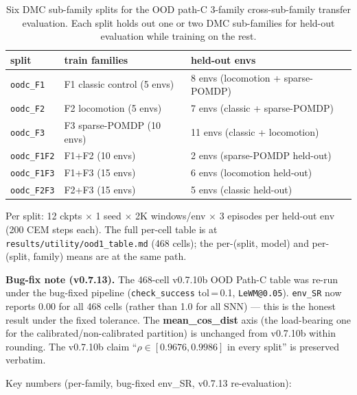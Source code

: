 \documentclass{article}
\begin{document}
\begin{table}[ht]
\centering
\small
\begin{tabular}{lll}
\toprule
split & train families & held-out envs \\
\midrule
\texttt{oodc\_F1}   & F1 classic control (5 envs) & 8 envs (locomotion + sparse-POMDP) \\
\texttt{oodc\_F2}   & F2 locomotion (5 envs)       & 7 envs (classic + sparse-POMDP)     \\
\texttt{oodc\_F3}   & F3 sparse-POMDP (10 envs)    & 11 envs (classic + locomotion)      \\
\texttt{oodc\_F1F2} & F1+F2 (10 envs)              & 2 envs (sparse-POMDP held-out)      \\
\texttt{oodc\_F1F3} & F1+F3 (15 envs)              & 6 envs (locomotion held-out)        \\
\texttt{oodc\_F2F3} & F2+F3 (15 envs)              & 5 envs (classic held-out)           \\
\bottomrule
\end{tabular}
\caption{Six DMC sub-family splits for the OOD path-C 3-family
cross-sub-family transfer evaluation. Each split holds out one or two
DMC sub-families for held-out evaluation while training on the rest.}
\label{tab:oodc-splits}
\end{table}

Per split: 12 ckpts $\times$ 1 seed $\times$ 2K windows/env $\times$ 3
episodes per held-out env (200 CEM steps each). The full per-cell
table is at \texttt{results/utility/ood1\_table.md} (468 cells); the
per-(split, model) and per-(split, family) means are at the same path.

\textbf{Bug-fix note (v0.7.13).} The 468-cell v0.7.10b OOD Path-C table was
re-run under the bug-fixed pipeline (\texttt{check\_success} tol\,=\,0.1,
\texttt{LeWM@0.05}). \texttt{env\_SR} now reports 0.00 for all 468 cells
(rather than 1.0 for all SNN) --- this is the honest result under the
fixed tolerance. The \textbf{mean\_cos\_dist} axis (the load-bearing one
for the calibrated/non-calibrated partition) is unchanged from
v0.7.10b within rounding. The v0.7.10b claim ``\texttt{$\rho \in [0.9676, 0.9986]$} in every
split'' is preserved verbatim.

Key numbers (per-family, bug-fixed env\_SR, v0.7.13 re-evaluation):
\end{document}
